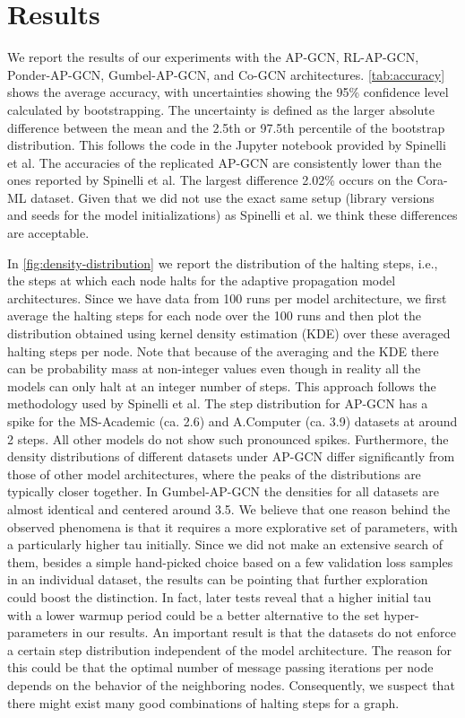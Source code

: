 \documentclass{gdl}
\begin{document}
\section{Results}
We report the results of our experiments with the AP-GCN, RL-AP-GCN, Ponder-AP-GCN, Gumbel-AP-GCN, and Co-GCN architectures. \autoref{tab:accuracy} shows the average accuracy, with uncertainties showing the 95\% confidence level calculated by bootstrapping. The uncertainty is defined as the larger absolute difference between the mean and the 2.5th or 97.5th percentile of the bootstrap distribution. This follows the code in the Jupyter notebook provided by Spinelli et al. The accuracies of the replicated AP-GCN are consistently lower than the ones reported by Spinelli et al. The largest difference 2.02\% occurs on the Cora-ML dataset. Given that we did not use the exact same setup (library versions and seeds for the model initializations) as Spinelli et al. we think these differences are acceptable. 

In \autoref{fig:density-distribution} we report the distribution of the halting steps, i.e., the steps at which each node halts for the adaptive propagation model architectures. Since we have data from 100 runs per model architecture, we first average the halting steps for each node over the 100 runs and then plot the distribution obtained using kernel density estimation (KDE) over these averaged halting steps per node. Note that because of the averaging and the KDE there can be probability mass at non-integer values even though in reality all the models can only halt at an integer number of steps. This approach follows the methodology used by Spinelli et al. The step distribution for AP-GCN has a spike for the MS-Academic (ca. 2.6) and A.Computer (ca. 3.9) datasets at around 2 steps. All other models do not show such pronounced spikes. Furthermore,  the density distributions of different datasets under AP-GCN differ significantly from those of other model architectures, where the peaks of the distributions are typically closer together. In Gumbel-AP-GCN the densities for all datasets are almost identical and centered around 3.5. We believe that one reason behind the observed phenomena is that it requires a more explorative set of parameters, with a particularly higher tau initially. Since we did not make an extensive search of them, besides a simple hand-picked choice based on a few validation loss samples in an individual dataset, the results can be pointing that further exploration could boost the distinction. In fact, later tests reveal that a higher initial tau with a lower warmup period could be a better alternative to the set hyper-parameters in our results.  
An important result is that the datasets do not enforce a certain step distribution independent of the model architecture. The reason for this could be that the optimal number of message passing iterations per node depends on the behavior of the neighboring nodes. Consequently, we suspect that there might exist many good combinations of halting steps for a graph.
\end{document}
